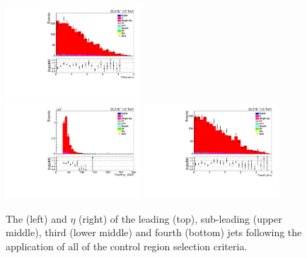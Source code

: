 \begin{figure}[ht]
\includegraphics[width=0.45\textwidth]{figs/background-estimation/plots/unblinded/ttbar_control/thirdJetEta_SingleTop_wMass_emu.pdf}
\\
\includegraphics[width=0.45\textwidth]{figs/background-estimation/plots/unblinded/ttbar_control/fourthJetPt_SingleTop_wMass_emu.pdf}
\includegraphics[width=0.45\textwidth]{figs/background-estimation/plots/unblinded/ttbar_control/fourthJetEta_SingleTop_wMass_emu.pdf}
\caption{
The \pT (left) and $\eta$ (right) of the leading (top), sub-leading (upper middle), third (lower middle) and fourth (bottom) jets following the application of all of the \ttbar control region selection criteria.
}
\label{fig:ttbar_jetsKinematics_wMass}
\end{figure}